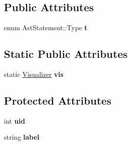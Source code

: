 \subsection*{Public Attributes}
\begin{DoxyCompactItemize}
\item 
\hypertarget{classAstStatement_a31c4d9fe3f321bdb8e14d20b22a91151}{enum Ast\-Statement\-::\-Type {\bfseries t}}\label{classAstStatement_a31c4d9fe3f321bdb8e14d20b22a91151}

\end{DoxyCompactItemize}
\subsection*{Static Public Attributes}
\begin{DoxyCompactItemize}
\item 
\hypertarget{classAST_aca9e6637209b31e03a09c0d42f29bdfa}{static \hyperlink{classVisualizer}{Visualizer} {\bfseries vis}}\label{classAST_aca9e6637209b31e03a09c0d42f29bdfa}

\end{DoxyCompactItemize}
\subsection*{Protected Attributes}
\begin{DoxyCompactItemize}
\item 
\hypertarget{classAST_a847b778f1c3dd5a19de32de432ee6e15}{int {\bfseries uid}}\label{classAST_a847b778f1c3dd5a19de32de432ee6e15}

\item 
\hypertarget{classAST_ab2e239ccc0688d2341724432ff5a1a31}{string {\bfseries label}}\label{classAST_ab2e239ccc0688d2341724432ff5a1a31}

\end{DoxyCompactItemize}
